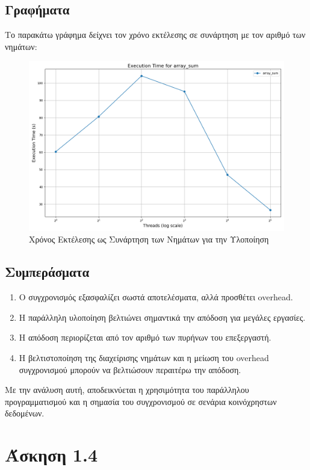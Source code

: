 \documentclass{article}
\begin{document}
\subsection*{Γραφήματα}
Το παρακάτω γράφημα δείχνει τον χρόνο εκτέλεσης σε συνάρτηση με τον αριθμό των νημάτων:
\begin{figure}[h]
    \centering
    \includegraphics[width=1\textwidth]{array_sum_results.png}
    \caption{Χρόνος Εκτέλεσης ως Συνάρτηση των Νημάτων για την Υλοποίηση \protect{}}
\end{figure}
\subsection*{Συμπεράσματα}
\begin{enumerate}
    \item Ο συγχρονισμός εξασφαλίζει σωστά αποτελέσματα, αλλά προσθέτει overhead.
    \item Η παράλληλη υλοποίηση βελτιώνει σημαντικά την απόδοση για μεγάλες εργασίες.
    \item Η απόδοση περιορίζεται από τον αριθμό των πυρήνων του επεξεργαστή.
    \item Η βελτιστοποίηση της διαχείρισης νημάτων και η μείωση του overhead συγχρονισμού μπορούν να βελτιώσουν περαιτέρω την απόδοση.
\end{enumerate}
Με την ανάλυση αυτή, αποδεικνύεται η χρησιμότητα του παράλληλου προγραμματισμού και η σημασία του συγχρονισμού σε σενάρια κοινόχρηστων δεδομένων.
\section*{Άσκηση 1.4}
\end{document}
